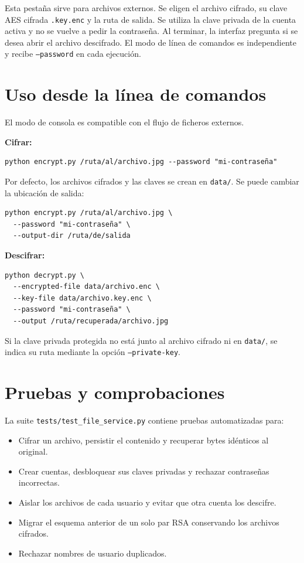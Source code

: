 \documentclass[12pt,a4paper]{article}
\begin{document}
Esta pestaña sirve para archivos externos. Se eligen el archivo cifrado, su clave AES cifrada \texttt{.key.enc} y la ruta de salida. Se utiliza la clave privada de la cuenta activa y no se vuelve a pedir la contraseña. Al terminar, la interfaz pregunta si se desea abrir el archivo descifrado. El modo de línea de comandos es independiente y recibe \texttt{--password} en cada ejecución.

\section{Uso desde la línea de comandos}

El modo de consola es compatible con el flujo de ficheros externos.

\textbf{Cifrar:}
\begin{verbatim}
python encrypt.py /ruta/al/archivo.jpg --password "mi-contraseña"
\end{verbatim}

Por defecto, los archivos cifrados y las claves se crean en \texttt{data/}. Se puede cambiar la ubicación de salida:

\begin{verbatim}
python encrypt.py /ruta/al/archivo.jpg \
  --password "mi-contraseña" \
  --output-dir /ruta/de/salida
\end{verbatim}

\textbf{Descifrar:}
\begin{verbatim}
python decrypt.py \
  --encrypted-file data/archivo.enc \
  --key-file data/archivo.key.enc \
  --password "mi-contraseña" \
  --output /ruta/recuperada/archivo.jpg
\end{verbatim}

Si la clave privada protegida no está junto al archivo cifrado ni en \texttt{data/}, se indica su ruta mediante la opción \texttt{--private-key}.

\section{Pruebas y comprobaciones}

La suite \texttt{tests/test\_file\_service.py} contiene pruebas automatizadas para:

\begin{itemize}
    \item Cifrar un archivo, persistir el contenido y recuperar bytes idénticos al original.
    \item Crear cuentas, desbloquear sus claves privadas y rechazar contraseñas incorrectas.
    \item Aislar los archivos de cada usuario y evitar que otra cuenta los descifre.
    \item Migrar el esquema anterior de un solo par RSA conservando los archivos cifrados.
    \item Rechazar nombres de usuario duplicados.
\end{itemize}
\end{document}
